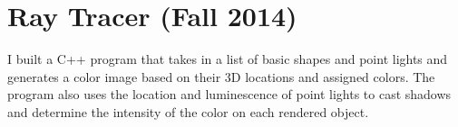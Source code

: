 
\section{Ray Tracer (Fall 2014)}

I built a C++ program that takes in a list of basic shapes and point lights
and generates a color image based on their 3D locations and assigned colors.
The program also uses the location and luminescence of point lights to
cast shadows and determine the intensity of the color on each rendered object.


